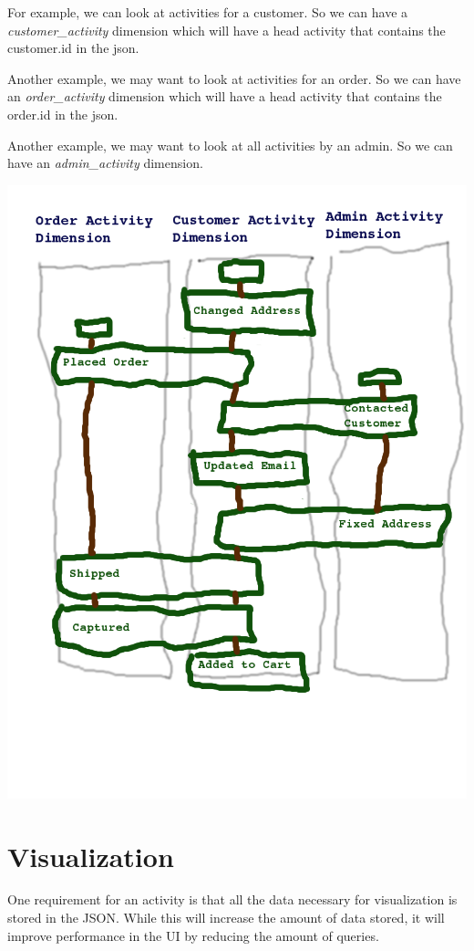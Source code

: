 \documentclass[11pt]{article}
\begin{document}
For example, we can look at activities for a customer. So we can have a \emph{customer\_activity}
dimension which will have a head activity that contains the customer.id in the json.

Another example, we may want to look at activities for an order. So we can have an \emph{order\_activity}
dimension which will have a head activity that contains the order.id in the json.

Another example, we may want to look at all activities by an admin. So we can have an \emph{admin\_activity}
dimension.

\includegraphics[scale=0.40]{dimension}

\section{Visualization}

One requirement for an activity is that all the data necessary for visualization is stored
in the JSON. While this will increase the amount of data stored, it will improve performance
in the UI by reducing the amount of queries. 
\end{document}
